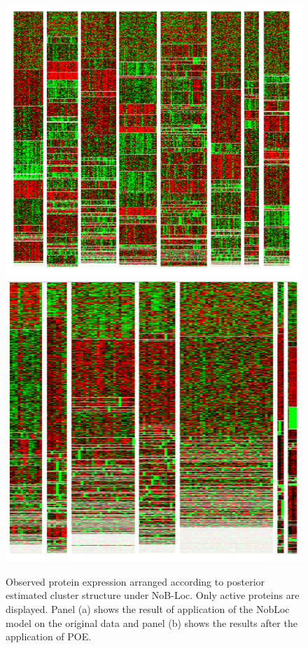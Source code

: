 \begin{figure}[H]
\centering
\includegraphics[scale=0.12]{./veera/all_heatmap_no_poe.png} \hspace{2cm}
\includegraphics[scale=0.12]{./veera/all_heatmap_after_poe.png}
\caption{Observed protein expression arranged according to posterior estimated cluster structure under NoB-Loc. Only active proteins are displayed. Panel (a) shows the result of application of the NobLoc model on the original data and panel (b) shows the results after the application of POE.}
\label{fig:nobloc_fit}
\end{figure} 

